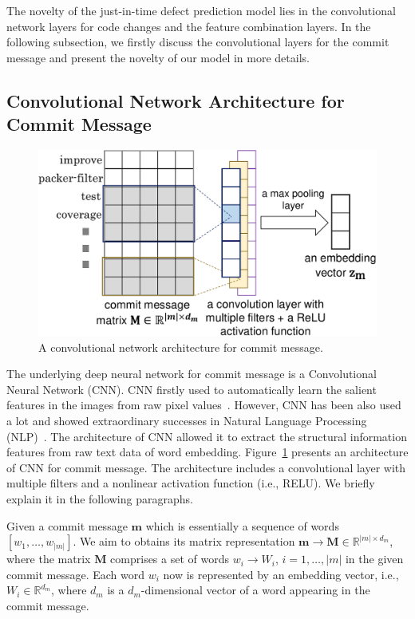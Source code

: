 The novelty of the just-in-time defect prediction model lies in the convolutional network layers for code changes and the feature combination layers. In the following subsection, we firstly discuss the convolutional layers for the commit message and present the novelty of our model in more details. 

\subsection{Convolutional Network Architecture for Commit Message}
\label{sec:cnn_msg}
\begin{figure}
\center
\includegraphics[scale=0.4]{figs/msg.pdf}
\caption{A convolutional network architecture for commit message.}
\label{fig:msg}
\end{figure}
The underlying deep neural network for commit message is a Convolutional Neural Network (CNN). CNN firstly used to automatically learn the salient features in the images from raw pixel values~\cite{krizhevsky2012imagenet}. However, CNN has been also used a lot and showed extraordinary successes in Natural Language Processing (NLP)~\cite{kim2014convolutional, dos2014deep, kalchbrenner2014convolutional, zhang2015character, johnson2014effective}. The architecture of CNN allowed it to extract the structural information features from raw text data of word embedding. Figure~\ref{fig:msg} presents an architecture of CNN for commit message. The architecture includes a convolutional layer with multiple filters and a nonlinear activation function (i.e., RELU). We briefly explain it in the following paragraphs. 

Given a commit message $\textbf{m}$ which is essentially a sequence of words $[w_1, \dots, w_{|m|}]$. We aim to obtains its matrix representation $\textbf{m} \rightarrow \textbf{M} \in \mathbb{R}^{|m| \times d_m}$, where the matrix $\textbf{M}$ comprises a set of words $w_i \rightarrow W_i$, $i = 1, \dots, |m|$ in the given commit message. Each word $w_i$ now is represented by an embedding vector, i.e., $W_i \in \mathbb{R}^{d_m}$, where $d_m$ is a $d_m$-dimensional vector of a word appearing in the commit message. 

